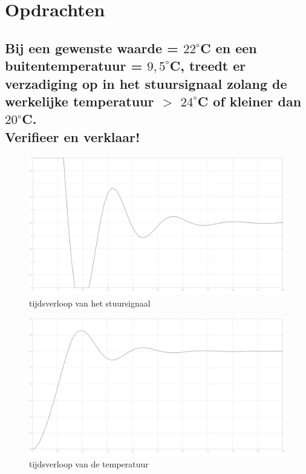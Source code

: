 \documentclass[a4paper, 12pt]{article}
\begin{document}
\section{Opdrachten}

\subsection{Bij een gewenste waarde = $22^\circ$C en een buitentemperatuur = $9,5^\circ$C, treedt er verzadiging op in het stuursignaal zolang de werkelijke temperatuur $>$ $24^\circ$C of kleiner dan $20^\circ$C. \\ Verifieer en verklaar!}

\begin{figure}[!h]
	\includegraphics[width=1\linewidth]{Labo4_1_stuursignaal.jpg}
	\caption{tijdsverloop van het stuursignaal}
\end{figure}

\begin{figure}[!h]
	\includegraphics[width=1\linewidth]{Labo4_1_temperatuur.jpg}
	\caption{tijdsverloop van de temperatuur}
\end{figure}
\end{document}
